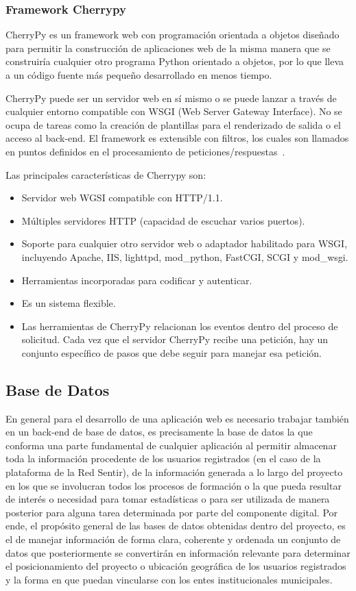 \documentclass[journal,transmag]{IEEEtran}
\begin{document}
\subsubsection{Framework Cherrypy}\label{sub:cherrypy}
CherryPy es un framework web con programación orientada a objetos diseñado para permitir la construcción de aplicaciones web de la misma manera que se construiría cualquier otro programa Python orientado a objetos, por lo que lleva a un código fuente más pequeño desarrollado en menos tiempo.

CherryPy puede ser un servidor web en sí mismo o se puede lanzar a través de cualquier entorno compatible con WSGI (Web Server Gateway Interface). No se ocupa de tareas como la creación de plantillas para el renderizado de salida o el acceso al back-end. El framework es extensible con filtros, los cuales son llamados en puntos definidos en el procesamiento de peticiones/respuestas~\cite{Cherrypy}.

Las principales características de Cherrypy son:

\begin{itemize}
	\item Servidor web WGSI compatible con HTTP/1.1.
	\item Múltiples servidores HTTP (capacidad de escuchar varios puertos).
	\item Soporte para cualquier otro servidor web o adaptador habilitado para WSGI, incluyendo Apache, 	IIS, lighttpd, mod\_python, FastCGI, SCGI y mod\_wsgi.
	\item Herramientas incorporadas para codificar y autenticar.
	\item Es un sistema flexible.
	\item Las herramientas de CherryPy relacionan los eventos dentro del proceso de solicitud. Cada vez que el servidor CherryPy recibe una petición, hay un conjunto específico de pasos que debe seguir para manejar esa petición.
\end{itemize}

\subsection{Base de Datos}
En general para el desarrollo de una aplicación web es necesario trabajar también en un back-end de base de datos, es precisamente la base de datos la que conforma una parte fundamental de cualquier aplicación al permitir almacenar toda la información procedente de los usuarios registrados (en el caso de la plataforma de la Red Sentir), de la información generada a lo largo del proyecto en los que se involucran todos los procesos de formación o la que pueda resultar de interés o necesidad para tomar estadísticas o para ser utilizada de manera posterior para alguna tarea determinada por parte del componente digital. Por ende, el propósito general de las bases de datos obtenidas dentro del proyecto, es el de manejar información de forma clara, coherente y ordenada un conjunto de datos que posteriormente se convertirán en información relevante para determinar el posicionamiento del proyecto o ubicación geográfica de los usuarios registrados y la forma en que puedan vincularse con los entes institucionales municipales. 
\end{document}
